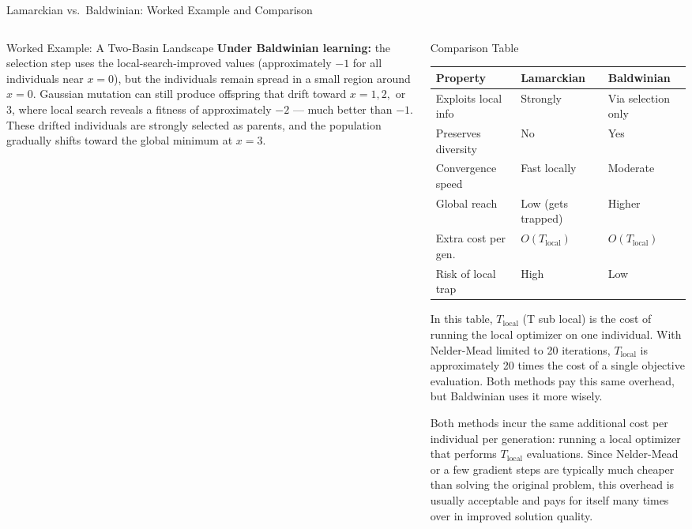\documentclass[aspectratio=169,10pt]{beamer}
\begin{document}
\begin{frame}[allowframebreaks]{Lamarckian vs.\ Baldwinian: Worked Example and Comparison}
\begin{columns}[T]
\begin{column}{0.50\textwidth}
\begin{exampleblock}{Worked Example: A Two-Basin Landscape}
        \textbf{Under Baldwinian learning:} the selection step
        uses the local-search-improved values (approximately $-1$
        for all individuals near $x = 0$), but the individuals
        remain spread in a small region around $x = 0$.  Gaussian
        mutation can still produce offspring that drift toward $x =
        1, 2,$ or $3$, where local search reveals a fitness of
        approximately $-2$ --- much better than $-1$.  These drifted
        individuals are strongly selected as parents, and the
        population gradually shifts toward the global minimum at
        $x = 3$.
      \end{exampleblock}
    \end{column}
    \begin{column}{0.48\textwidth}
      \begin{block}{Comparison Table}
        \footnotesize
        \begin{tabular}{lll}
          \toprule
          Property & Lamarckian & Baldwinian \\
          \midrule
          Exploits local info & Strongly & Via selection only \\
          Preserves diversity & No & Yes \\
          Convergence speed & Fast locally & Moderate \\
          Global reach & Low (gets trapped) & Higher \\
          Extra cost per gen. & $O(T_\text{local})$ & $O(T_\text{local})$ \\
          Risk of local trap & High & Low \\
          \bottomrule
        \end{tabular}

        \vspace{6pt}
        In this table, $T_\text{local}$ (T sub local) is the cost
        of running the local optimizer on one individual.  With
        Nelder-Mead limited to 20 iterations, $T_\text{local}$ is
        approximately 20 times the cost of a single objective
        evaluation.  Both methods pay this same overhead, but
        Baldwinian uses it more wisely.
      \end{block}

      \vspace{4pt}
      Both methods incur the same additional cost per individual
      per generation: running a local optimizer that performs
      $T_\text{local}$ evaluations.  Since Nelder-Mead or a few
      gradient steps are typically much cheaper than solving the
      original problem, this overhead is usually acceptable and
      pays for itself many times over in improved solution quality.


\end{column}
\end{columns}
\end{frame}
\end{document}
